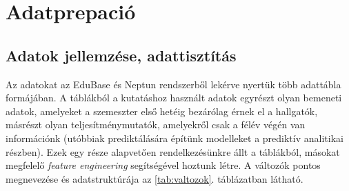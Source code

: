 \documentclass[12pt]{article}
\begin{document}
\section{Adatprepació}

\subsection{Adatok jellemzése, adattisztítás}

Az adatokat az EduBase és Neptun rendszerből lekérve nyertük több adattábla formájában. A táblákból a kutatáshoz használt adatok egyrészt olyan bemeneti adatok, amelyeket a szemeszter első hetéig bezárólag érnek el a hallgatók, másrészt olyan teljesítménymutatók, amelyekről csak a félév végén van információnk (utóbbiak prediktálására építünk modelleket a prediktív analitikai részben). Ezek egy része alapvetően rendelkezésünkre állt a táblákból, másokat megfelelő \textit{feature engineering} segítségével hoztunk létre. A változók pontos megnevezése és adatstruktúrája az \ref{tab:valtozok}. táblázatban látható.
\end{document}
